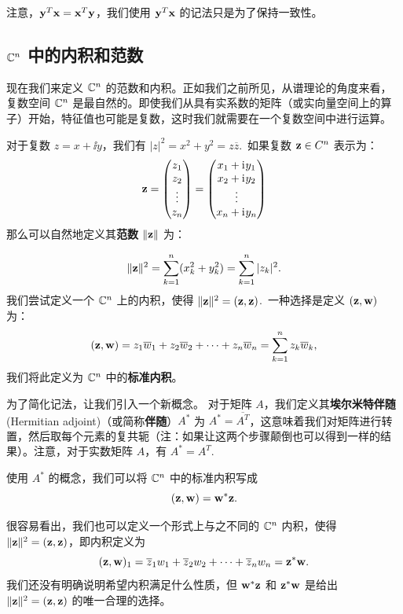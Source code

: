 注意，$\mathbf{y}^T \mathbf{x} = \mathbf{x}^T \mathbf{y}$，我们使用 $\mathbf{y}^T \mathbf{x}$ 的记法只是为了保持一致性。

\subsection{\texorpdfstring{$\mathbb{C}^n$ 中的内积和范数}{C^n 中的内积和范数}}\label{sec:05-01-02}

现在我们来定义 $\mathbb{C}^n$ 的范数和内积。正如我们之前所见，从谱理论的角度来看，复数空间 $\mathbb{C}^n$ 是最自然的。即使我们从具有实系数的矩阵（或实向量空间上的算子）开始，特征值也可能是复数，这时我们就需要在一个复数空间中进行运算。

对于复数 $z = x + \ii y$，我们有 $|z|^2 = x^2 + y^2 = z\overline{z}$.~如果复数 $\mathbf{z} \in C^n$ 表示为：
$$\mathbf{z} = \begin{pmatrix} z_1 \\ z_2 \\ \vdots \\ z_n \end{pmatrix} = \begin{pmatrix} x_1 + \mathrm{i}\mkern1mu y_1 \\ x_2 + \mathrm{i}\mkern1mu y_2 \\ \vdots \\ x_n + \mathrm{i}\mkern1mu y_n \end{pmatrix}$$
那么可以自然地定义其\textbf{范数} $\| \mathbf{z} \|$ 为：

$$\| \mathbf{z} \|^2 = \sum_{k=1}^n (x_k^2 + y_k^2) = \sum_{k=1}^n |z_k|^2.$$
我们尝试定义一个 $\mathbb{C}^n$ 上的内积，使得 $\| \mathbf{z} \|^2 = (\mathbf{z}, \mathbf{z})$.~一种选择是定义 $(\mathbf{z}, \mathbf{w})$ 为：
$$(\mathbf{z}, \mathbf{w}) = z_1 \overline{w}_1 + z_2 \overline{w}_2 + \dots + z_n \overline{w}_n = \sum_{k=1}^n z_k \overline{w}_k,$$
我们将此定义为 $\mathbb{C}^n$ 中的\textbf{标准内积}。

为了简化记法，让我们引入一个新概念。
对于矩阵 $A$，我们定义其\textbf{埃尔米特伴随}(Hermitian adjoint)（或简称\textbf{伴随}）$A^*$ 为 $A^* = \overline{A^T}$，这意味着我们对矩阵进行转置，然后取每个元素的复共轭（注：如果让这两个步骤颠倒也可以得到一样的结果）。注意，对于实数矩阵 $A$，有 $A^* = A^T$.~

使用 $A^*$ 的概念，我们可以将 $\mathbb{C}^n$ 中的标准内积写成
$$(\mathbf{z}, \mathbf{w}) = \mathbf{w}^* \mathbf{z}.$$

\begin{remark*}
很容易看出，我们也可以定义一个形式上与之不同的 $\mathbb{C}^n$ 内积，使得 $\| \mathbf{z} \|^2 = (\mathbf{z}, \mathbf{z})$，即内积定义为
$$(\mathbf{z}, \mathbf{w})_1 = \overline{z}_1 w_1 + \overline{z}_2 w_2 + \dots + \overline{z}_n w_n = \mathbf{z}^* \mathbf{w}.$$
我们还没有明确说明希望内积满足什么性质，但 $\mathbf{w}^* \mathbf{z}$ 和 $\mathbf{z}^* \mathbf{w}$ 是给出 $\| \mathbf{z} \|^2 = (\mathbf{z}, \mathbf{z})$ 的唯一合理的选择。
\end{remark*}

